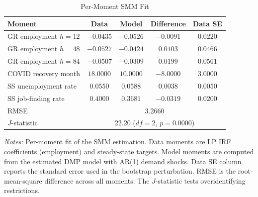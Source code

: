 \begin{table}[H]
\centering
\caption{Per-Moment SMM Fit}
\begin{threeparttable}
\small
\begin{tabular}{lcccc}
\toprule
Moment & Data & Model & Difference & Data SE \\
\midrule
GR employment $h=12$ & $-0.0435$ & $-0.0526$ & $-0.0091$ & $0.0220$ \\
GR employment $h=48$ & $-0.0527$ & $-0.0424$ & $0.0103$ & $0.0466$ \\
GR employment $h=84$ & $-0.0507$ & $-0.0309$ & $0.0199$ & $0.0561$ \\
COVID recovery month & $18.0000$ & $10.0000$ & $-8.0000$ & $3.0000$ \\
SS unemployment rate & $0.0550$ & $0.0588$ & $0.0038$ & $0.0050$ \\
SS job-finding rate & $0.4000$ & $0.3681$ & $-0.0319$ & $0.0200$ \\
\midrule
RMSE & \multicolumn{4}{c}{3.2660} \\
$J$-statistic & \multicolumn{4}{c}{22.20 ($df=2$, $p=0.0000$)} \\
\bottomrule
\end{tabular}
\begin{tablenotes}[flushleft]
\small
\item \textit{Notes:} Per-moment fit of the SMM estimation. Data moments are LP IRF coefficients (employment) and steady-state targets. Model moments are computed from the estimated DMP model with AR(1) demand shocks. Data SE column reports the standard error used in the bootstrap perturbation. RMSE is the root-mean-square difference across all moments. The $J$-statistic tests overidentifying restrictions.
\end{tablenotes}
\end{threeparttable}
\label{tab:smm_fit}
\end{table}
